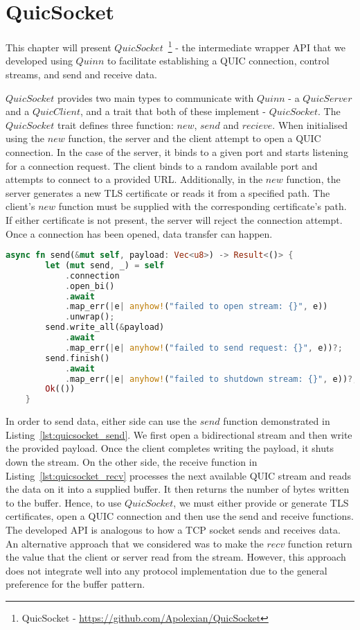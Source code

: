 \chapter{QuicSocket}\label{chapter:quic_socket}

This chapter will present $QuicSocket$~\footnote{QuicSocket - \url{https://github.com/Apolexian/QuicSocket}} - the intermediate wrapper API that we developed using $Quinn$ to facilitate establishing a QUIC connection, control streams, and send and receive data.

$QuicSocket$ provides two main types to communicate with $Quinn$ - a $QuicServer$ and a $QuicClient$, and a trait that both of these implement - $QuicSocket$.
The $QuicSocket$ trait defines three function: $new$, $send$ and $recieve$. 
When initialised using the $new$ function, the server and the client attempt to open a QUIC connection.
In the case of the server, it binds to a given port and starts listening for a connection request.
The client binds to a random available port and attempts to connect to a provided URL.
Additionally, in the $new$ function, the server generates a new TLS certificate or reads it from a specified path.
The client's $new$ function must be supplied with the corresponding certificate's path.
If either certificate is not present, the server will reject the connection attempt.
Once a connection has been opened, data transfer can happen.

\begin{lstlisting}[language=Rust, caption={The $send$ function that the $QuicClient$ and $QuicServer$ use for sending data. Data transfer is facilitated by opening a bidirectional stream on the pre-existing connection.}, label=lst:quicsocket_send]
    async fn send(&mut self, payload: Vec<u8>) -> Result<()> {
        let (mut send, _) = self
            .connection
            .open_bi()
            .await
            .map_err(|e| anyhow!("failed to open stream: {}", e))
            .unwrap();
        send.write_all(&payload)
            .await
            .map_err(|e| anyhow!("failed to send request: {}", e))?;
        send.finish()
            .await
            .map_err(|e| anyhow!("failed to shutdown stream: {}", e))?;
        Ok(())
    }
\end{lstlisting}

In order to send data, either side can use the $send$ function demonstrated in Listing~\ref{lst:quicsocket_send}.
We first open a bidirectional stream and then write the provided payload.
Once the client completes writing the payload, it shuts down the stream.
On the other side, the receive function in Listing~\ref{lst:quicsocket_recv} processes the next available QUIC stream and reads the data on it into a supplied buffer.
It then returns the number of bytes written to the buffer.
Hence, to use $QuicSocket$, we must either provide or generate TLS certificates, open a QUIC connection and then use the send and receive functions.
The developed API is analogous to how a TCP socket sends and receives data.
An alternative approach that we considered was to make the $recv$ function return the value that the client or server read from the stream.
However, this approach does not integrate well into any protocol implementation due to the general preference for the buffer pattern.

